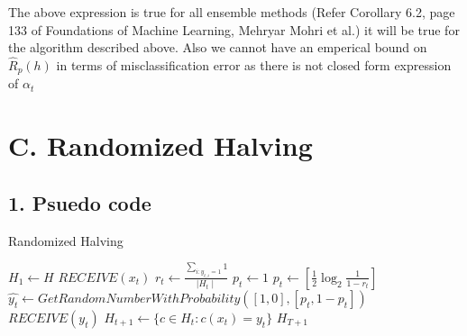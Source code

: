 \documentclass{article}
\begin{document}
The above expression is true for all ensemble methods (Refer Corollary 6.2, page 133 of Foundations of Machine Learning, Mehryar Mohri et al.) it will be true for the algorithm described above.  Also we cannot have an emperical bound on $\hat{R}_p(h)$ in terms of misclassification error as there is not closed form expression of $\alpha_{t}$

\newpage

\section*{C. Randomized Halving}
\subsection*{1. Psuedo code}

\begin{algorithm}
  \caption{Randomized Halving}\label{euclid}
  \begin{algorithmic}[1]
    \State{} $ H_{1} \gets H$
    \State{} $RECEIVE(x_{t})$
    \State{} \( r_{t} \gets{} \frac{\sum_{i:y_{t,i} = 1} 1}{\mid H_{t} \mid}  \)
    \State{} \( p_{t} \gets{} 1 \)
    \State{} \( p_{t} \gets{} [\frac{1}{2} \log_2{\frac{1}{1- r_{t}}} ] \)
    \EndIf{}
    \State{} \( \hat{y_{t}} \gets{} GetRandomNumberWithProbability([1, 0], [p_{t}, 1-p_{t}]) \)
    \State{} $RECEIVE(y_{t})$
    \State{} \( H_{t+1}  \gets{} \{ c \in H_{t}: c(x_{t}) = y_{t} \}\)
    \EndIf{}
    \EndFor{}
    \Return{} $H_{T+1} $
  \end{algorithmic}
\end{algorithm}
\end{document}
